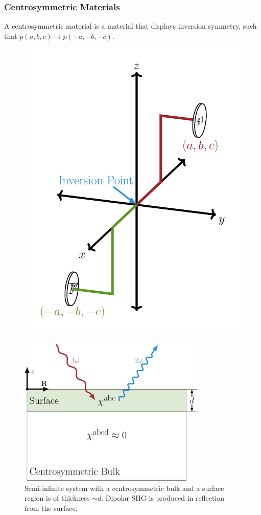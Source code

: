 \documentclass{beamer}
\begin{document}
\begin{frame}
\frametitle{Centrosymmetric Materials}
A centrosymmetric material is a material that displays inversion symmetry, such
that $p(a,b,c) \rightarrow p(-a,-b,-c)$.
\begin{figure}
\centering
\includegraphics[height=0.7\textheight]{diag-centrosymmetry}
\end{figure}
\end{frame}

\begin{frame}
\begin{figure}
\centering
\includegraphics[width=0.8\textwidth]{diag-system}
\caption{Semi-infinite system with a centrosymmetric bulk and a surface region
is of thickness $\sim d$. Dipolar SHG is produced in reflection from the
surface.}
\end{figure}
\end{frame}
\end{document}
